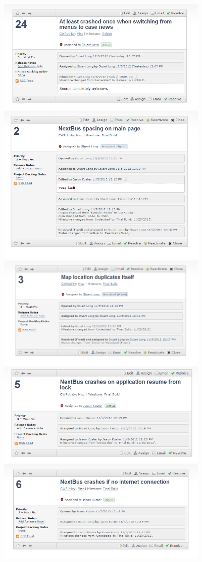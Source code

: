 \documentclass[pdftex,12pt,letter]{article}
\begin{document}
\FloatBarrier
\includegraphics[width=4in]{bugs8.png}
\FloatBarrier
\includegraphics[width=4in]{bugs9.png}
\FloatBarrier
\includegraphics[width=4in]{bugs10.png}
\FloatBarrier
\includegraphics[width=4in]{bugs11.png}
\FloatBarrier
\includegraphics[width=4in]{bugs12.png}
\end{document}
